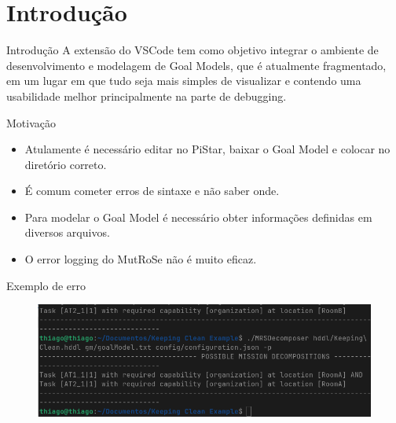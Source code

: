 \documentclass{beamer}
\begin{document}

    


\section{Introdução}
\begin{frame}{Introdução}
  A extensão do VSCode tem como objetivo integrar o ambiente de desenvolvimento e modelagem de Goal Models, 
  que é atualmente fragmentado, em um lugar em que tudo seja mais simples de visualizar e contendo uma usabilidade melhor 
  principalmente na parte de debugging.
\end{frame}



\begin{frame}{Motivação}
    \begin{itemize}
    \item Atulamente é necessário editar no PiStar, baixar o Goal Model e colocar no diretório correto.
    \item É comum cometer erros de sintaxe e não saber onde.
    \item Para modelar o Goal Model é necessário obter informações definidas em diversos arquivos.
    \item O error logging do MutRoSe não é muito eficaz.
  \end{itemize}
\end{frame}
\begin{frame}{Exemplo de erro}
  \begin{figure}[!h]
    \centering
    \includegraphics[width=1\textwidth]{erro_mutrose.png} 
    \caption{}
  \end{figure}
\end{frame}
\end{document}
